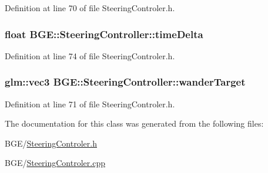 Definition at line 70 of file Steering\-Controler.\-h.

\hypertarget{class_b_g_e_1_1_steering_controller_a2663615d3340930be34a999daa7f735b}{
\subsubsection[{time\-Delta}]{\setlength{\rightskip}{0pt plus 5cm}float B\-G\-E\-::\-Steering\-Controller\-::time\-Delta}}\label{class_b_g_e_1_1_steering_controller_a2663615d3340930be34a999daa7f735b}


Definition at line 74 of file Steering\-Controler.\-h.

\hypertarget{class_b_g_e_1_1_steering_controller_ab6afb73864e6da7472bc49a725257c67}{
\subsubsection[{wander\-Target}]{\setlength{\rightskip}{0pt plus 5cm}glm\-::vec3 B\-G\-E\-::\-Steering\-Controller\-::wander\-Target}}\label{class_b_g_e_1_1_steering_controller_ab6afb73864e6da7472bc49a725257c67}


Definition at line 71 of file Steering\-Controler.\-h.



The documentation for this class was generated from the following files\-:\begin{DoxyCompactItemize}
\item 
B\-G\-E/\hyperlink{_steering_controler_8h}{Steering\-Controler.\-h}\item 
B\-G\-E/\hyperlink{_steering_controler_8cpp}{Steering\-Controler.\-cpp}\end{DoxyCompactItemize}
